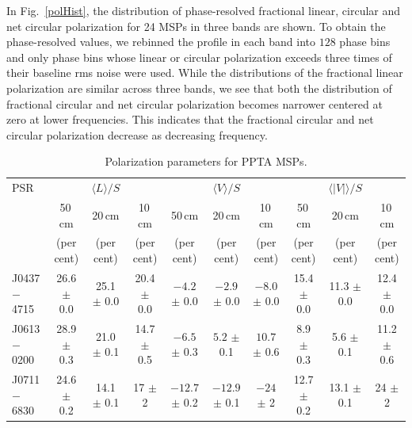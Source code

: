 \documentclass[useAMS,usenatbib]{mn2e}
\begin{document}
In Fig.~\ref{polHist}, the distribution of phase-resolved fractional linear, 
circular and net circular polarization for 24 MSPs in three bands are shown.
%
To obtain the phase-resolved values, we rebinned the profile in each band into 
$128$ phase bins and only phase bins whose linear or circular polarization 
exceeds three times of their baseline rms noise were used. 
%
While the distributions of the fractional linear polarization are similar 
across three bands, we see that both the distribution of fractional circular 
and net circular polarization becomes narrower centered at zero at lower 
frequencies. 
%
This indicates that the fractional circular and net circular polarization 
decrease as decreasing frequency.

%
\begin{table}
\begin{center}
\caption{Polarization parameters for PPTA MSPs.}
\label{tablePol}
\begin{tabular}{lccccccccc}
\hline
PSR              &                  &    $\langle L \rangle/S$    &                  &               & $\langle V \rangle/S$       &                  &      &      $\langle|V|\rangle/S$       &                      \\
								 &    50\,cm      &   20\,cm       &    10\,cm &    50\,cm      &   20\,cm       &    10\,cm &    50\,cm      &   20\,cm       &    10\,cm              \\
								 &     (per cent)   &         (per cent)          &     (per cent)   &    (per cent)   &         (per cent)          &     (per cent)   &   (per cent)   &         (per cent)          &     (per cent)  \\
\hline
J0437$-$4715& 26.6 $\pm$ 0.0& 25.1 $\pm $ 0.0& 20.4 $\pm$ 0.0&$ -4.2$ $\pm$ 0.0 &$ -2.9$ $\pm$ 0.0 &$ -8.0$ $\pm$ 0.0 & 15.4 $\pm$ 0.0 & 11.3 $\pm$ 0.0 & 12.4 $\pm$ 0.0 \\
J0613$-$0200& 28.9 $\pm$ 0.3& 21.0 $\pm $ 0.1& 14.7 $\pm$ 0.5&$ -6.5$ $\pm$ 0.3 &$ 5.2 $ $\pm$ 0.1 &$ 10.7$ $\pm$ 0.6 &  8.9 $\pm$ 0.3 &  5.6 $\pm$ 0.1 & 11.2 $\pm$ 0.6 \\
J0711$-$6830& 24.6 $\pm$ 0.2& 14.1 $\pm $ 0.1& 17   $\pm$ 2  &$-12.7$ $\pm$ 0.2 &$-12.9$ $\pm$ 0.1 &$ -24 $ $\pm$ 2   & 12.7 $\pm$ 0.2 & 13.1 $\pm$ 0.1 & 24   $\pm$ 2 \\

\end{tabular}
\end{center}
\end{table}
\end{document}
